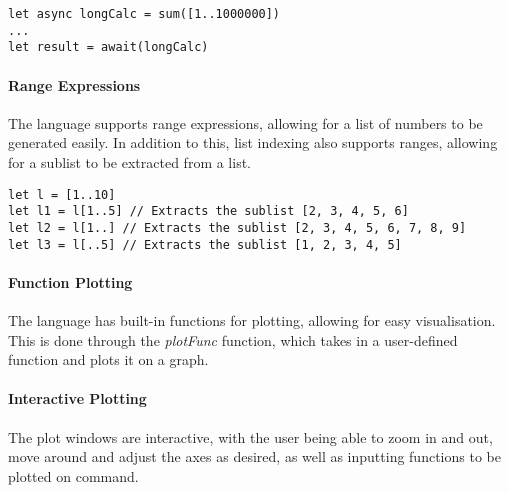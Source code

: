 \begin{verbatim}
let async longCalc = sum([1..1000000])
...
let result = await(longCalc)
\end{verbatim}

\paragraph{Range Expressions} The language supports range expressions, allowing for a list of numbers to be
generated easily.
In addition to this, list indexing also supports ranges, allowing for a sublist to be extracted from a list.

\begin{verbatim}
let l = [1..10]
let l1 = l[1..5] // Extracts the sublist [2, 3, 4, 5, 6]
let l2 = l[1..] // Extracts the sublist [2, 3, 4, 5, 6, 7, 8, 9]
let l3 = l[..5] // Extracts the sublist [1, 2, 3, 4, 5]
\end{verbatim}

\paragraph{Function Plotting} The language has built-in functions for plotting, allowing for easy
visualisation.
This is done through the \textit{plotFunc} function, which takes in a user-defined function and plots it on a graph.

\paragraph{Interactive Plotting} The plot windows are interactive, with the user being able to zoom in and out,
move around and adjust the axes as desired, as well as inputting functions to be plotted on command.